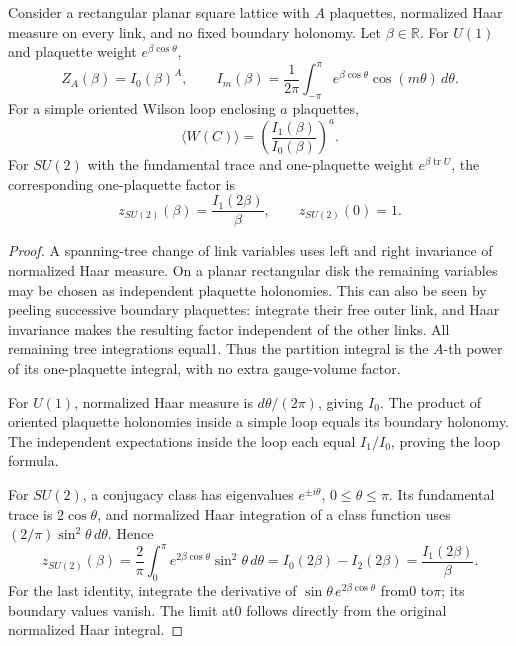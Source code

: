 \begin{proposition}\ours
Consider a rectangular planar square lattice with \(A\) plaquettes, normalized Haar measure on every link, and no fixed boundary holonomy. Let \(\beta\in\mathbb R\). For \(U(1)\) and plaquette weight \(e^{\beta\cos\theta}\),
\[
 Z_A(\beta)=I_0(\beta)^A,
 \qquad
 I_m(\beta)=\frac1{2\pi}\int_{-\pi}^{\pi}
       e^{\beta\cos\theta}\cos(m\theta)\,d\theta.
\]
For a simple oriented Wilson loop enclosing \(a\) plaquettes,
\[
 \langle W(C)\rangle=
    \left(\frac{I_1(\beta)}{I_0(\beta)}\right)^a.
\]
For \(SU(2)\) with the fundamental trace and one-plaquette weight
\(e^{\beta\operatorname{tr}U}\), the corresponding one-plaquette factor is
\[
 z_{SU(2)}(\beta)=\frac{I_1(2\beta)}{\beta},
 \qquad z_{SU(2)}(0)=1.
\]
\end{proposition}
\begin{proof}
A spanning-tree change of link variables uses left and right invariance of normalized Haar measure. On a planar rectangular disk the remaining variables may be chosen as independent plaquette holonomies. This can also be seen by peeling successive boundary plaquettes: integrate their free outer link, and Haar invariance makes the resulting factor independent of the other links. All remaining tree integrations equal1. Thus the partition integral is the \(A\)-th power of its one-plaquette integral, with no extra gauge-volume factor.

For \(U(1)\), normalized Haar measure is \(d\theta/(2\pi)\), giving \(I_0\). The product of oriented plaquette holonomies inside a simple loop equals its boundary holonomy. The independent expectations inside the loop each equal \(I_1/I_0\), proving the loop formula.

For \(SU(2)\), a conjugacy class has eigenvalues \(e^{\pm i\theta}\), \(0\le\theta\le\pi\). Its fundamental trace is \(2\cos\theta\), and normalized Haar integration of a class function uses \((2/\pi)\sin^2\theta\,d\theta\). Hence
\[
 z_{SU(2)}(\beta)
 =\frac2\pi\int_0^\pi e^{2\beta\cos\theta}\sin^2\theta\,d\theta
 =I_0(2\beta)-I_2(2\beta)
 =\frac{I_1(2\beta)}{\beta}.
\]
For the last identity, integrate the derivative of
\(\sin\theta\,e^{2\beta\cos\theta}\) from0 to\(\pi\); its boundary values vanish. The limit at0 follows directly from the original normalized Haar integral.
\end{proof}

